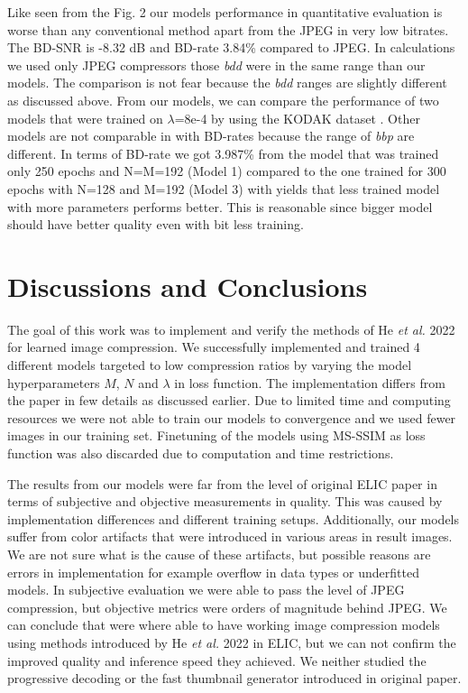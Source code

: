 \documentclass{article}
\begin{document}
\vfill\pagebreak
\vfill\pagebreak

Like seen from the Fig. 2 our models performance in quantitative evaluation is worse than any conventional method apart from the JPEG in very low bitrates. The BD-SNR is -8.32 dB and BD-rate 3.84\% compared to JPEG. In calculations we used only JPEG compressors those \textit{bdd} were in the same range than our models. The comparison is not fear because the \textit{bdd} ranges are slightly different as discussed above. From our models, we can compare the performance of two models that were trained on $\lambda$=8e-4 by using the KODAK dataset \cite{kodak}. Other models are not comparable in with BD-rates because the range of \textit{bbp} are different. In terms of BD-rate we got 3.987\% from the model that was trained only 250 epochs and N=M=192 (Model 1) compared to the one trained for 300 epochs with N=128 and M=192 (Model 3) with yields that less trained model with more parameters performs better. This is reasonable since bigger model should have better quality even with bit less training.


\section{Discussions and Conclusions}
The goal of this work was to implement and verify the methods of He \textit{et al.} 2022 \cite{ELIC} for learned image compression. We successfully implemented and trained 4 different models targeted to low compression ratios by varying the model hyperparameters $M$, $N$ and $\lambda$ in loss function. The implementation differs from the paper in few details as discussed earlier. Due to limited time and computing resources we were not able to train our models to convergence and we used fewer images in our training set. Finetuning of the models using MS-SSIM as loss function was also discarded due to computation and time restrictions. 

The results from our models were far from the level of original ELIC paper in terms of subjective and objective measurements in quality. This was caused by implementation differences and different training setups. Additionally, our models suffer from color artifacts that were introduced in various areas in result images. We are not sure what is the cause of these artifacts, but possible reasons are errors in implementation for example overflow in data types or underfitted models. In subjective evaluation we were able to pass the level of JPEG compression, but objective metrics were orders of magnitude behind JPEG. We can conclude that were where able to have working image compression models using methods introduced by He \textit{et al.} 2022 \cite{ELIC} in ELIC, but we can not confirm the improved quality and inference speed they achieved. We neither studied the progressive decoding or the fast thumbnail generator introduced in original paper. 
\end{document}
